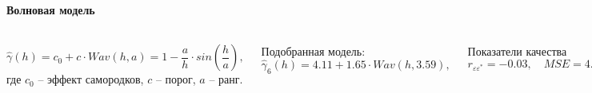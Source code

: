 \documentclass[10pt,pdf,aspectratio=169,hyperref={unicode},notheorems]{beamer}
\theoremstyle{definition}
\theoremstyle{example}
\theoremstyle{plain}
\begin{document}
\begin{frame}
  \frametitle{\large\subsecname}
  \framesubtitle{Волновая модель}
  \begin{columns}[c]
  \column{3in}
  \begin{equation}
  \label{eq:wave}
    \widehat{\gamma}(h) = c_0 + c \cdot Wav(h, a) = 1 - \frac{a}{h} \cdot sin(\frac{h}{a}),
  \end{equation}
  где $ c_0 $ -- эффект самородков, $ c $ -- порог, $ a $ -- ранг.

  \vspace{0.5em}

  Подобранная модель:
  \begin{equation}
  \label{eq:gamma9}
    \widehat{\gamma}_6(h) = 4.11 + 1.65 \cdot Wav(h, 3.59),
  \end{equation}

  Показатели качества
  \begin{equation*}
    r_{\varepsilon\varepsilon^{*}} = -0.03, \quad MSE = 4.20
  \end{equation*}

  \column{3in}
  \vspace{-14.5pt}
  \begin{figure}[H]
    \includegraphics[width=0.9\linewidth]{../../figures/variogram/auto-rob-5-modeled.png} \\
    \caption{Модель семивариограммы $\widehat{\gamma}_6(h)$}
    \includegraphics[width=0.9\linewidth]{../../figures/variogram/auto-rob-5-cross-prediction.png}
    \caption{Прогноз по модели $\widehat{\gamma}_6(h)$}
  \end{figure}
  \end{columns}
\end{frame}
\end{document}
